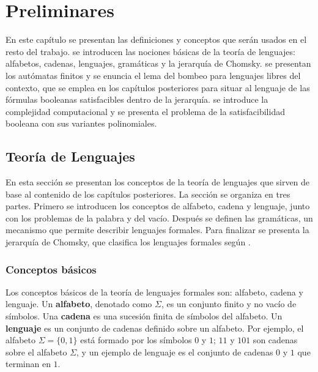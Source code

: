 \documentclass{report}
\theoremstyle{definition}
\theoremstyle{plain}
\theoremstyle{remark}
\begin{document}
\chapter{Preliminares}
\label{cap:preliminares}

En este capítulo se presentan las definiciones y conceptos que serán usados en el resto del trabajo.  se introducen las nociones básicas de la teoría de lenguajes: alfabetos, cadenas, lenguajes, gramáticas y la jerarquía de Chomsky.  se presentan los autómatas finitos y se enuncia el lema del bombeo para lenguajes libres del contexto, que se emplea en los capítulos posteriores para situar al lenguaje de las fórmulas booleanas satisfacibles dentro de la jerarquía.   se introduce la complejidad computacional y se presenta el problema de la satisfacibilidad booleana con sus variantes polinomiales.

\section{Teoría de Lenguajes}
\label{sec:teoria-lenguajes}

En esta sección se presentan los conceptos de la teoría de lenguajes que sirven de base al contenido de los capítulos posteriores. La sección se organiza en tres partes. Primero se introducen los conceptos de alfabeto, cadena y lenguaje, junto con los problemas de la palabra y del vacío. Después se definen las gramáticas, un mecanismo que permite describir lenguajes formales. Para finalizar se presenta la jerarquía de Chomsky, que clasifica los lenguajes formales según .

\subsection{Conceptos básicos}

Los conceptos básicos de la teoría de lenguajes formales son: alfabeto, cadena y lenguaje. Un \textbf{alfabeto}, denotado como $\Sigma$, es un conjunto finito y no vacío de símbolos. Una \textbf{cadena} es una sucesión finita de símbolos del alfabeto. Un \textbf{lenguaje} es un conjunto de cadenas definido sobre un alfabeto. Por ejemplo, el alfabeto $\Sigma = \{0, 1\}$ está formado por los símbolos $0$ y $1$; $11$ y $101$ son cadenas sobre el alfabeto $\Sigma$, y un ejemplo de lenguaje es el conjunto de cadenas  $0$ y $1$ que terminan en $1$.
\end{document}
